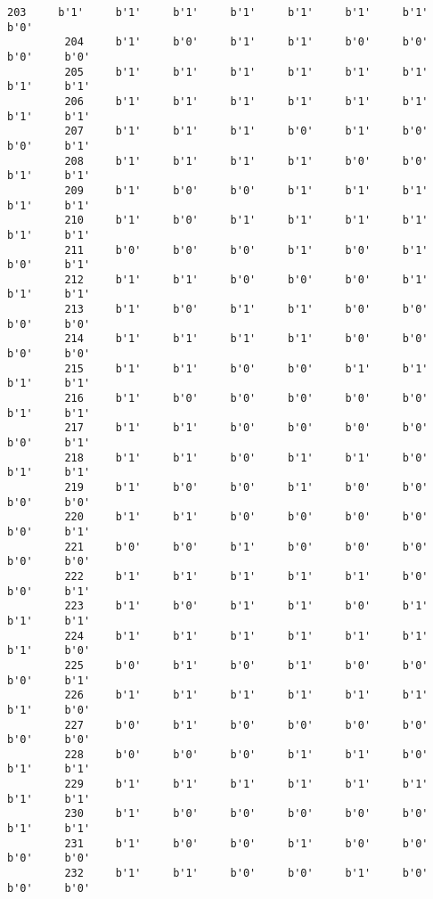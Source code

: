 \documentclass[11pt]{article}
\begin{document}
\begin{Verbatim}[commandchars=\\\{\}]
         203     b'1'     b'1'     b'1'     b'1'     b'1'     b'1'     b'1'     b'0'   
         204     b'1'     b'0'     b'1'     b'1'     b'0'     b'0'     b'0'     b'0'   
         205     b'1'     b'1'     b'1'     b'1'     b'1'     b'1'     b'1'     b'1'   
         206     b'1'     b'1'     b'1'     b'1'     b'1'     b'1'     b'1'     b'1'   
         207     b'1'     b'1'     b'1'     b'0'     b'1'     b'0'     b'0'     b'1'   
         208     b'1'     b'1'     b'1'     b'1'     b'0'     b'0'     b'1'     b'1'   
         209     b'1'     b'0'     b'0'     b'1'     b'1'     b'1'     b'1'     b'1'   
         210     b'1'     b'0'     b'1'     b'1'     b'1'     b'1'     b'1'     b'1'   
         211     b'0'     b'0'     b'0'     b'1'     b'0'     b'1'     b'0'     b'1'   
         212     b'1'     b'1'     b'0'     b'0'     b'0'     b'1'     b'1'     b'1'   
         213     b'1'     b'0'     b'1'     b'1'     b'0'     b'0'     b'0'     b'0'   
         214     b'1'     b'1'     b'1'     b'1'     b'0'     b'0'     b'0'     b'0'   
         215     b'1'     b'1'     b'0'     b'0'     b'1'     b'1'     b'1'     b'1'   
         216     b'1'     b'0'     b'0'     b'0'     b'0'     b'0'     b'1'     b'1'   
         217     b'1'     b'1'     b'0'     b'0'     b'0'     b'0'     b'0'     b'1'   
         218     b'1'     b'1'     b'0'     b'1'     b'1'     b'0'     b'1'     b'1'   
         219     b'1'     b'0'     b'0'     b'1'     b'0'     b'0'     b'0'     b'0'   
         220     b'1'     b'1'     b'0'     b'0'     b'0'     b'0'     b'0'     b'1'   
         221     b'0'     b'0'     b'1'     b'0'     b'0'     b'0'     b'0'     b'0'   
         222     b'1'     b'1'     b'1'     b'1'     b'1'     b'0'     b'0'     b'1'   
         223     b'1'     b'0'     b'1'     b'1'     b'0'     b'1'     b'1'     b'1'   
         224     b'1'     b'1'     b'1'     b'1'     b'1'     b'1'     b'1'     b'0'   
         225     b'0'     b'1'     b'0'     b'1'     b'0'     b'0'     b'0'     b'1'   
         226     b'1'     b'1'     b'1'     b'1'     b'1'     b'1'     b'1'     b'0'   
         227     b'0'     b'1'     b'0'     b'0'     b'0'     b'0'     b'0'     b'0'   
         228     b'0'     b'0'     b'0'     b'1'     b'1'     b'0'     b'1'     b'1'   
         229     b'1'     b'1'     b'1'     b'1'     b'1'     b'1'     b'1'     b'1'   
         230     b'1'     b'0'     b'0'     b'0'     b'0'     b'0'     b'1'     b'1'   
         231     b'1'     b'0'     b'0'     b'1'     b'0'     b'0'     b'0'     b'0'   
         232     b'1'     b'1'     b'0'     b'0'     b'1'     b'0'     b'0'     b'0'   

\end{Verbatim}
\end{document}
